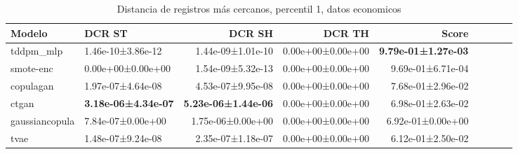 \begin{table}[H]
\centering
\fontsize{10}{14}\selectfont
\caption{Distancia de registros más cercanos, percentil 1, datos economicos}
\label{table-dcr-economicos-a}
\begin{tabular}{|l|l|r|r|r|r|r|r|r|}
\hline
\rowcolor[gray]{0.8}
Modelo & DCR ST & DCR SH & DCR TH & \textbf{Score} \\
\hline tddpm\_mlp & 1.46e-10±3.86e-12 & \cellcolor[rgb]{0.9, 0.54, 0.52} 1.44e-09±1.01e-10 & 0.00e+00±0.00e+00 & \bfseries 9.79e-01±1.27e-03 \\
\hline smote-enc & \cellcolor[rgb]{0.9, 0.54, 0.52} 0.00e+00±0.00e+00 & 1.54e-09±5.32e-13 & 0.00e+00±0.00e+00 & 9.69e-01±6.71e-04 \\
\hline copulagan & 1.97e-07±4.64e-08 & 4.53e-07±9.95e-08 & 0.00e+00±0.00e+00 & 7.68e-01±2.96e-02 \\
\hline ctgan & \bfseries 3.18e-06±4.34e-07 & \bfseries 5.23e-06±1.44e-06 & 0.00e+00±0.00e+00 & 6.98e-01±2.63e-02 \\
\hline gaussiancopula & 7.84e-07±0.00e+00 & 1.75e-06±0.00e+00 & 0.00e+00±0.00e+00 & 6.92e-01±0.00e+00 \\
\hline tvae & 1.48e-07±9.24e-08 & 2.35e-07±1.18e-07 & 0.00e+00±0.00e+00 & \cellcolor[rgb]{0.9, 0.54, 0.52} 6.12e-01±2.50e-02 \\
\hline
\end{tabular}
\end{table}
